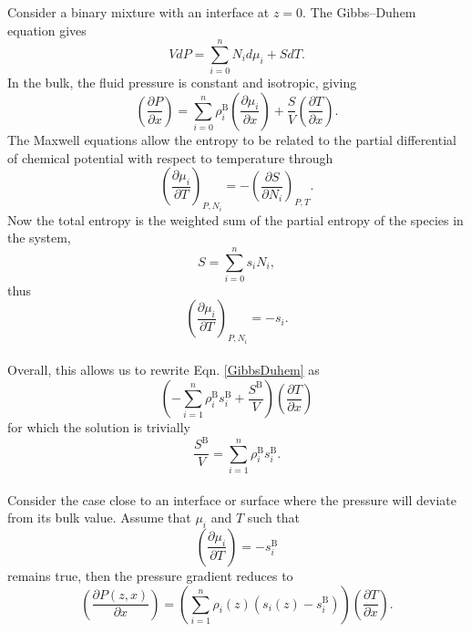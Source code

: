 Consider a binary mixture with an interface at $z=0$.
The Gibbs--Duhem equation gives
\begin{equation}
V dP = \sum_{i=0}^{n} N_{i} d\mu_{i} + S dT.
\end{equation}
In the bulk, the fluid pressure is constant and isotropic, giving
\begin{equation}
\label{GibbsDuhem}
\left( \frac{\partial P}{\partial x}\right) = \sum_{i=0}^{n} \rho_{i}^{\mathrm{B}} \left(\frac{\partial \mu_{i}}{\partial x}\right) + \frac{S}{V} \left( \frac{\partial T}{\partial x}\right).
\end{equation}
The Maxwell equations allow the entropy to be related to the partial differential of chemical potential with respect to temperature through
\begin{equation}
\left( \frac{\partial\mu_{i}}{\partial T} \right)_{P,N_{i}} = - \left(\frac{\partial S}{\partial N_{i}}\right)_{P,T}.
\end{equation}
Now the total entropy is the weighted sum of the partial entropy of the species in the system, 
\begin{equation}
S = \sum_{i=0}^{n}s_{i}N_{i},
\end{equation}
thus
\begin{equation}
\left( \frac{\partial\mu_{i}}{\partial T} \right)_{P,N_{i}} = - s_{i}.
\end{equation}
\\
Overall, this allows us to rewrite Eqn. \ref{GibbsDuhem} as
\begin{equation}
\left( - \sum_{i=1}^{n}\rho_{i}^{\mathrm{B}}s_{i}^{\mathrm{B}}+\frac{S^{\mathrm{B}}}{V}\right)\left(\frac{\partial T}{\partial x}\right)
\end{equation}
for which the solution is trivially 
\begin{equation}
\frac{S^{\mathrm{B}}}{V} = \sum_{i=1}^{n}\rho_{i}^{\mathrm{B}}s_{i}^{\mathrm{B}}.
\end{equation}
\\
Consider the case close to an interface or surface where the pressure will deviate from its bulk value.
Assume that $\mu_{i}$ and $T$ such that
\begin{equation}
\left(\frac{\partial \mu_{i}}{\partial T}\right) = - s_{i}^{\mathrm{B}}
\end{equation}
remains true, then the pressure gradient reduces to
\begin{equation}
\left(\frac{\partial P(z,x)}{\partial x}\right) = \left(\sum_{i=1}^{n}\rho_{i}(z)\left(s_{i}(z)-s_{i}^{\mathrm{B}}\right)\right)\left(\frac{\partial T}{\partial x}\right).
\end{equation}

